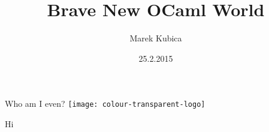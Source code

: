 \documentclass{beamer}
\title{Brave New OCaml World}
\author{Marek Kubica}
\institute{Lambda Days}
\date{25.2.2015}
\begin{document}
\maketitle

\begin{frame}{Who am I even?}
  \texttt{[image: colour-transparent-logo]}

  Hi
\end{frame}
\end{document}
